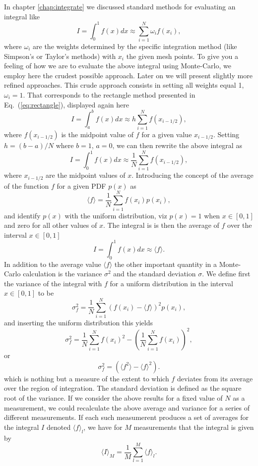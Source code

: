 In chapter \ref{chap:integrate} we discussed standard methods for evaluating an integral like
\[
   I=\int_0^1 f(x)dx\approx \sum_{i=1}^N\omega_if(x_i),
\]
where $\omega_i$ are the weights determined by the specific integration method  
(like Simpson's or Taylor's methods) with $x_i$ the given mesh points. 
To give you a feeling of how we are to evaluate the above integral using Monte-Carlo,
we employ here the crudest possible approach. Later on we will present
slightly more refined approaches.
This crude approach consists in setting all weights equal 1, $\omega_i=1$.  That corresponds to the 
rectangle method presented in Eq.~(\ref{eq:rectangle}), displayed again here
\[
   I=\int_a^bf(x) dx \approx  h\sum_{i=1}^N f(x_{i-1/2}), 
\]
where $f(x_{i-1/2})$ is the midpoint value of $f$ for a  given value $x_{i-1/2}$.
Setting $h=(b-a)/N$ where $b=1$, $a=0$, we can then rewrite the above integral as
\[
   I=\int_0^1 f(x)dx\approx \frac{1}{N}\sum_{i=1}^Nf(x_{i-1/2}),
\]
where $x_{i-1/2}$ are the midpoint values of $x$.
Introducing the concept of the average of the function $f$ for a given PDF $p(x)$ as 
\[
   \langle f \rangle = \frac{1}{N}\sum_{i=1}^Nf(x_i)p(x_i),
\]
and identify $p(x)$ with the uniform distribution, viz
$ p(x)=1$ when $x\in [0,1]$ and zero for all other values of $x$.
The integral is 
is then  the average of $f$ over the interval $x \in [0,1]$ 
\[
      I=\int_0^1 f(x)dx\approx \langle f \rangle. 
\]
In addition to the average value $\langle f \rangle$ the other 
important quantity in a  
Monte-Carlo calculation is the variance $\sigma^2$ and 
the standard deviation $\sigma$. We define first the variance
of the integral with $f$ for a uniform distribution in the interval 
$x \in [0,1]$ to be
\[
  \sigma^2_f=\frac{1}{N}\sum_{i=1}^N(f(x_i)-\langle f\rangle)^2p(x_i), 
\]
and inserting the uniform distribution this yields 
\[
  \sigma^2_f=\frac{1}{N}\sum_{i=1}^Nf(x_i)^2- 
  \left(\frac{1}{N}\sum_{i=1}^Nf(x_i)\right)^2,
\]
or 
\[
  \sigma^2_f=\left(\langle f^2\rangle - 
                                 \langle f \rangle^2\right).
\]
which is nothing but a measure of the extent to
which $f$ deviates from its average over the region of integration. 
The standard deviation is defined as the square root of the variance.
If we consider the above results for 
a fixed value of $N$ as a measurement, 
we could recalculate the 
above average and variance for a series of different measurements.
If each such measumerent produces a set of averages for the 
integral $I$ denoted $\langle f\rangle_l$, we have for $M$ measurements
that the integral is given by 
\[
   \langle I \rangle_M=\frac{1}{M}\sum_{l=1}^{M}\langle f\rangle_l.
\]
